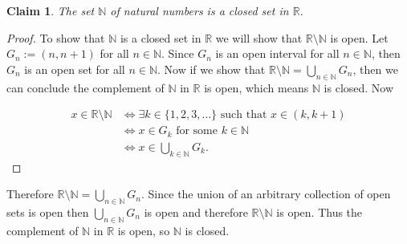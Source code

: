 \documentclass[12pt]{article}
\newtheorem*{claim}{Claim}
\begin{document}
\begin{enumerate}[label=\arabic*., itemsep=1.5cm]
\vspace{0.5cm}

\begin{claim}
The set $\mathbb{N}$ of natural numbers is a closed set in $\mathbb{R}$.
\end{claim}

\begin{proof}
To show that $\mathbb{N}$ is a closed set in $\mathbb{R}$ we will show that $\mathbb{R} \setminus \mathbb{N}$ is open. Let $G_n := (n, n + 1)$ for all $n \in \mathbb{N}$. Since $G_n$ is an open interval for all $n \in \mathbb{N}$, then $G_n$ is an open set for all $n \in \mathbb{N}$. Now if we show that $\displaystyle \mathbb{R} \setminus \mathbb{N} = \bigcup_{n \in \mathbb{N}} G_n$, then we can conclude the complement of $\mathbb{N}$ in $\mathbb{R}$ is open, which means $\mathbb{N}$ is closed. Now

\begin{equation*}
\begin{split}
x \in \mathbb{R} \setminus \mathbb{N} &\iff \exists k \in \{1, 2, 3, \ldots\} \text{ such that } x \in (k, k + 1) \\
&\iff x \in G_k \text{ for some } k \in \mathbb{N} \\
&\iff x \in \bigcup_{k \in \mathbb{N}} G_k.
\end{split}
\end{equation*}
\end{proof}

Therefore $\displaystyle \mathbb{R} \setminus \mathbb{N} = \bigcup_{n \in \mathbb{N}} G_n$. Since the union of an arbitrary collection of open sets is open then $\displaystyle \bigcup_{n \in \mathbb{N}} G_n$ is open and therefore $\mathbb{R} \setminus \mathbb{N}$ is open. Thus the complement of $\mathbb{N}$ in $\mathbb{R}$ is open, so $\mathbb{N}$ is closed.
\end{enumerate}
\end{document}
